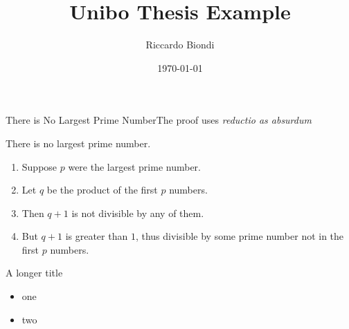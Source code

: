 \documentclass[slidescentered]{beamer}
\title{Unibo Thesis Example}
\subtitle{}
\author{Riccardo Biondi}
\date{\today}
\begin{document}
	\begin{frame}[noframenumbering]
		\titlepage
	\end{frame}


	\begin{frame}{There is No Largest Prime Number}{The proof uses \textit{reductio as absurdum}}

		\begin{theorem}
			There is no largest prime number.
		\end{theorem}

		\begin{enumerate}

  		\item<1-| alert@1> Suppose $p$ were the largest prime number.
  		\item<2-> Let $q$ be the product of the first $p$ numbers.
  		\item<3-> Then $q+1$ is not divisible by any of them.
  		\item<1-> But $q + 1$ is greater than $1$, thus divisible by some prime
  		number not in the first $p$ numbers.

		\end{enumerate}

	\end{frame}

	\begin{frame}{A longer title}

		\begin{itemize}
	  	\item one
	  	\item two
		\end{itemize}

	\end{frame}
\end{document}
